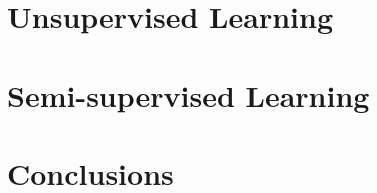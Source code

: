\section{Unsupervised Learning}
\label{sec:unsupervised-learning}

\section{Semi-supervised Learning}
\label{sec:semi-supervised-learning}

\section{Conclusions}
\label{sec:conclusions-ml}

%
